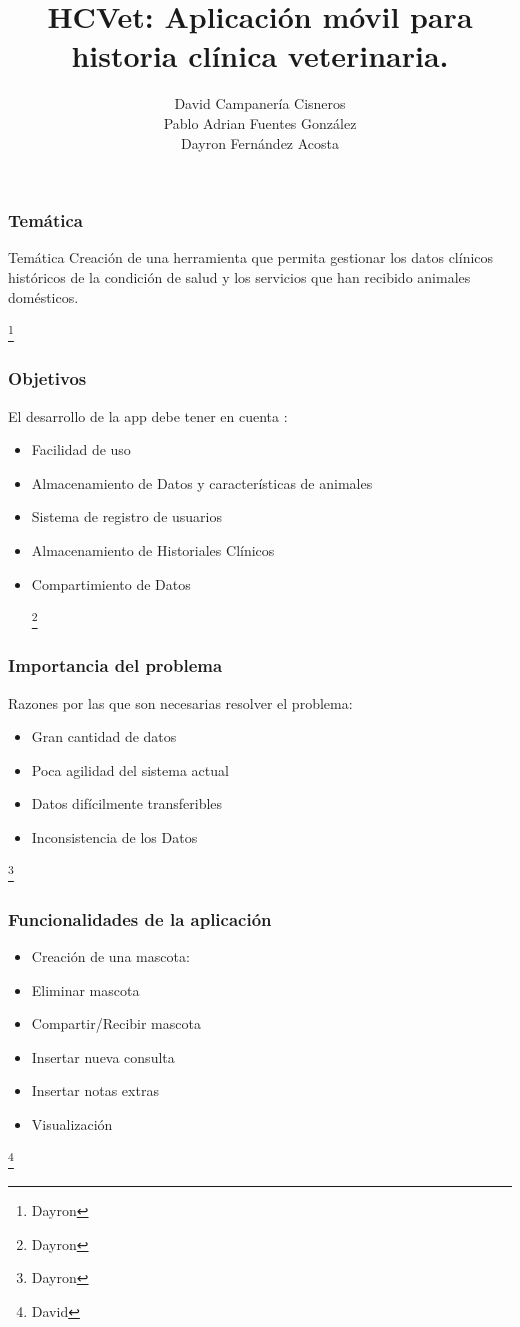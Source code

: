 \documentclass[14pt]{beamer}
\author[Campanería, Fernández, Fuentes]
{David Campanería Cisneros\\Pablo Adrian Fuentes González\\Dayron Fernández Acosta}
\title[Aplicación   HCVet]
{HCVet: Aplicación móvil para historia clínica veterinaria.}
\institute[UH]
{\textbf{Tutores:}\\ José Alejandro Mesejo Chiong\\ José Luis Castañeda Lorenzo}
\begin{document}
\begin{frame}
\titlepage
\end{frame}



\begin{frame}
\frametitle{Temática}
\begin{block}{Temática}
Creación de una herramienta que permita gestionar los datos clínicos históricos de la condición de salud y los servicios que han recibido animales domésticos.

\end{block}

\footnote{Dayron}
\end{frame}


\begin{frame}
\frametitle{Objetivos}
El desarrollo de la app debe tener en cuenta :
\begin{itemize}
\item Facilidad de uso
\item Almacenamiento de Datos y características de animales
\item Sistema de registro de usuarios
\item Almacenamiento de Historiales Clínicos
\item Compartimiento de Datos 

\footnote{Dayron}
\end{itemize}
\end{frame}

\begin{frame}
\frametitle{Importancia del problema}
Razones por las que son necesarias resolver el problema:
\begin{itemize}
\item Gran cantidad de datos
\item Poca agilidad del sistema actual
\item Datos difícilmente transferibles
\item Inconsistencia de los Datos
\end{itemize}
\footnote{Dayron}
\end{frame}

\begin{frame}
\frametitle{Funcionalidades de la aplicación}
\begin{itemize}
\item Creación de una mascota:
\item Eliminar mascota
\item Compartir/Recibir mascota
\item Insertar nueva consulta
\item Insertar notas extras
\item Visualización
\end{itemize}
\footnote{David}
\end{frame}
\end{document}
